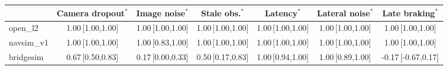 \begin{tabular}{@{}lcccccc@{}}
\toprule
 & Camera dropout$^{\ast}$ & Image noise$^{\ast}$ & Stale obs.$^{\ast}$ & Latency$^{\ast}$ & Lateral noise$^{\ast}$ & Late braking$^{\ast}$ \\
\midrule
open\_l2 & 1.00\,{\scriptsize[1.00,1.00]} & 1.00\,{\scriptsize[1.00,1.00]} & 1.00\,{\scriptsize[1.00,1.00]} & 1.00\,{\scriptsize[1.00,1.00]} & 1.00\,{\scriptsize[1.00,1.00]} & 1.00\,{\scriptsize[1.00,1.00]} \\
navsim\_v1 & 1.00\,{\scriptsize[1.00,1.00]} & 1.00\,{\scriptsize[0.83,1.00]} & 1.00\,{\scriptsize[1.00,1.00]} & 1.00\,{\scriptsize[1.00,1.00]} & 1.00\,{\scriptsize[1.00,1.00]} & 1.00\,{\scriptsize[1.00,1.00]} \\
bridgesim & 0.67\,{\scriptsize[0.50,0.83]} & 0.17\,{\scriptsize[0.00,0.33]} & 0.50\,{\scriptsize[0.17,0.83]} & 1.00\,{\scriptsize[0.94,1.00]} & 1.00\,{\scriptsize[0.89,1.00]} & -0.17\,{\scriptsize[-0.67,0.17]} \\
\bottomrule
\end{tabular}
